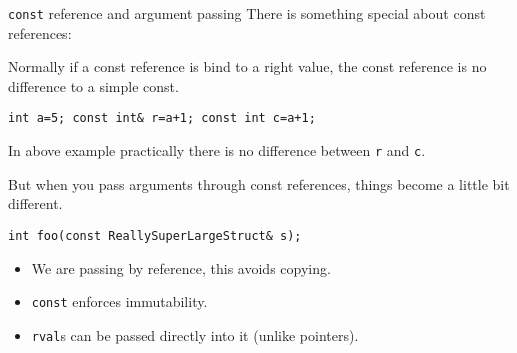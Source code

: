 \begin{frame}[fragile]{\texttt{const} reference and argument passing}
There is something special about const references:
\begin{center}
\end{center}
Normally if a const reference is bind to a right value, the const reference is no difference to a simple const. 
\begin{verbatim}
int a=5; const int& r=a+1; const int c=a+1;
\end{verbatim}
In above example practically there is no difference between \texttt{r} and \texttt{c}.

But when you pass arguments through const references, things become a little bit different.
\begin{verbatim}
int foo(const ReallySuperLargeStruct& s);
\end{verbatim}
\vspace{-0.05in}
\begin{itemize}
	\item We are passing by reference, this avoids copying.
	\item \texttt{const} enforces immutability.
	\item \texttt{rval}s can be passed directly into it (unlike pointers).
\end{itemize}
\end{frame}



	


